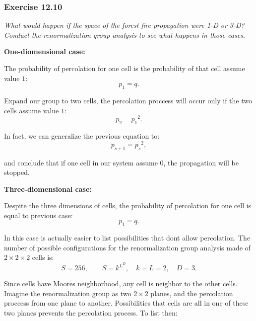 
\subsubsection*{Exercise 12.10}

\textit{What would happen if the space of the forest fire propagation were 1-D
or 3-D? Conduct the renormalization group analysis to see what happens in those
cases.}

\vspace{5mm}
\textbf{One-diomensional case:}

\vspace{5mm}
The probability of percolation for one cell is the probability of that cell
assume value $1$:
\begin{equation}
  p_1 = q.
\end{equation}

Expand our group to two cells, the percolation proccess will occur only if the
two cells assume value $1$:
\begin{equation}
  p_2 = {p_1}^2.
\end{equation}

In fact, we can generalize the previous equation to:
\begin{equation}
  p_{s+1} = {p_s}^2,
\end{equation}

and conclude that if one cell in our system assume $0$, the propagation will be
stopped.

\vspace{5mm}
\textbf{Three-diomensional case:}

\vspace{5mm}
Despite the three dimensions of cells, the probability of percolation for one
cell is equal to previous case:
\begin{equation}
  p_1 = q.
\end{equation}

In this case is actually easier to list possibilities that don\textquotesingle t
allow percolation. The number of possible configurations for the renormalization
group analysis made of $2\times2\times2$ cells is:
\begin{equation}
  S = 256, \qquad S = k^{L^{D}}, \quad k = L = 2, \quad D = 3.
\end{equation}

Since cells have Moore\textquotesingle s neighborhood, any cell is neighbor to
the other cells. Imagine the renormalization group as two $2\times2$ planes, and
the percolation proccess from one plane to another. Possibilities that cells are
all in one of these two planes prevents the percolation process. To list then:

